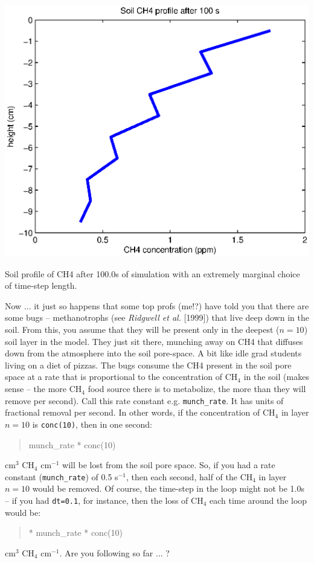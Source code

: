 \documentclass{tufte-book} %
\newenvironment{docspec}{\begin{quotation}\ttfamily\parskip0pt\parindent0pt\ignorespaces}{\end{quotation}}
\begin{document}
\begin{marginfigure}[0.0in]
\includegraphics[width=\linewidth]{ch4-ch4model-model2.eps}
\caption{Soil profile of CH4 after 100.0s of simulation with an extremely marginal choice of time-step length.}
\label{fig:ch4-ch4model-model2}
\end{marginfigure}

Now ... it just so happens that some top profs (me!?) have told you that there are some bugs -- methanotrophs (see \textit{Ridgwell et al.} [1999]) that live  deep down in the soil. From this, you assume that they will be present only in the deepest (\(n=10\)) soil layer in the model. They just sit there, munching away on CH4 that diffuses down from the atmosphere into the soil pore-space. A bit like idle grad students living on a diet of pizzas. The bugs consume the CH4 present in the soil pore space at a rate that is proportional to the concentration of CH\(_{4}\) in the soil (makes sense -- the more CH\(_{4}\) food source there is to metabolize, the more than they will remove per second). Call this rate constant e.g. \texttt{munch\_rate}. It has units of fractional removal per second. In other words, if the concentration of CH\(_{4}\) in layer \(n=10\) is \texttt{conc(10)}, then in one second:
\begin{docspec}
munch\_rate * conc(10)
\end{docspec}
cm\(^{3}\) CH\(_{4}\) cm\(^{-1}\) will be lost from the soil pore space. So, if you had a rate constant (\texttt{munch\_rate}) of 0.5 s\(^{-1}\), then each second, half of the CH\(_{4}\) in layer \(n=10\) would be removed. Of course, the time-step in the loop might not be 1.0s -- if you had \texttt{dt=0.1}, for instance, then the loss of CH\(_{4}\) each time around the loop would be:
\begin{docspec}
0.1 * munch\_rate * conc(10)
\end{docspec}
cm\(^{3}\) CH\(_{4}\) cm\(^{-1}\). Are you following so far ... ?
\end{document}
